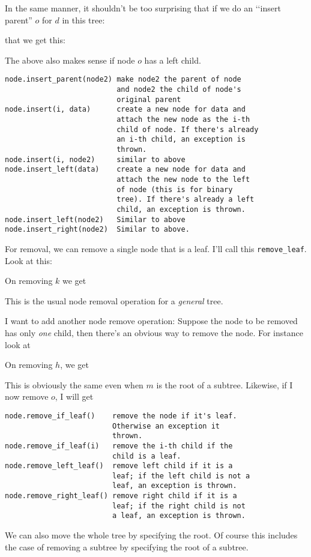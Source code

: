

In the same manner, it shouldn't be too surprising that 
if we do an \lq\lq insert parent'' $o$ for $d$ in this tree:



that we get this:



The above also makes sense if node $o$ has a left child.

\begin{Verbatim}[frame=single]
node.insert_parent(node2) make node2 the parent of node
                          and node2 the child of node's
                          original parent
node.insert(i, data)      create a new node for data and 
                          attach the new node as the i-th 
                          child of node. If there's already 
                          an i-th child, an exception is 
                          thrown.
node.insert(i, node2)     similar to above
node.insert_left(data)    create a new node for data and 
                          attach the new node to the left 
                          of node (this is for binary 
                          tree). If there's already a left 
                          child, an exception is thrown.
node.insert_left(node2)   Similar to above
node.insert_right(node2)  Similar to above.
\end{Verbatim}

For removal, we can
remove a single node that is a leaf.
I'll call this \verb!remove_leaf!.
Look at this:



On removing $k$ we get



This is the usual node removal operation for a \textit{general} tree.

I want to add another node remove operation:
Suppose the node to be removed has only \textit{one} child,
then there's an obvious way to remove the node.
For instance look at



On removing $h$, we get


 
This is obviously the same even when $m$ is the root of a subtree.
Likewise, if I now remove $o$, I will get




\begin{Verbatim}[frame=single]
node.remove_if_leaf()    remove the node if it's leaf.
                         Otherwise an exception it 
                         thrown.
node.remove_if_leaf(i)   remove the i-th child if the
                         child is a leaf.
node.remove_left_leaf()  remove left child if it is a 
                         leaf; if the left child is not a 
                         leaf, an exception is thrown.
node.remove_right_leaf() remove right child if it is a 
                         leaf; if the right child is not 
                         a leaf, an exception is thrown.

\end{Verbatim}

We can also move the whole tree by specifying the root.
Of course this includes the case of removing a subtree by specifying
the root of a subtree.

